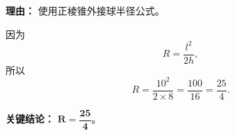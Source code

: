 \begin{examplebox}
\begin{description}[style=nextline, leftmargin=2.8em, labelsep=0.5em, itemsep=0.45em]
		      \par\textbf{理由：} 使用正棱锥外接球半径公式。

		\item[\textbf{另解（直接用侧棱形式）：}]
		      因为
		      \[
			      R=\frac{l^2}{2h},
		      \]
		      所以
		      \[
			      R=\frac{10^2}{2\times8}
			      =
			      \frac{100}{16}
			      =
			      \frac{25}{4}.
		      \]
	\end{description}

	\textbf{\textcolor{CExample}{关键结论：}} $\mathbf{R=\dfrac{25}{4}}$。

\end{examplebox}